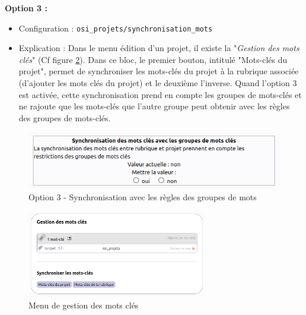 


\textbf{Option 3 :} 
\begin{itemize}
    \item Configuration : \texttt{osi\_projets/synchronisation\_mots}
    \item Explication : Dans le menu édition d'un projet, il existe la "\textit{Gestion des mots clés}" (Cf figure \ref{option3_bis}). Dans ce bloc, le premier bouton, intitulé "Mots-clés du projet", permet de synchroniser les mots-clés du projet à la rubrique associée (d'ajouter les mots clés du projet) et le deuxième l'inverse. Quand l'option 3 est activée, cette synchronisation prend en compte les groupes de mots-clés et ne rajoute que les mots-clés que l'autre groupe peut obtenir avec les règles des groupes de mots-clés.
\end{itemize}
\vspace{0.5cm}
\begin{figure}[h]
    \centering
    \includegraphics[trim=0 0 0 0, clip, width=1\textwidth]{./images/c3.png}
    \caption{Option 3 - Synchronisation avec les règles des groupes de mots}
    \label{option3}
\end{figure}
\vspace{0.5cm}
\begin{figure}[h]
    \centering
    \includegraphics[trim=0 0 0 0, clip, width=0.7\textwidth]{./images/c3_bis.png}
    \caption{Menu de gestion des mots clés}
    \label{option3_bis}
\end{figure}

\newpage

